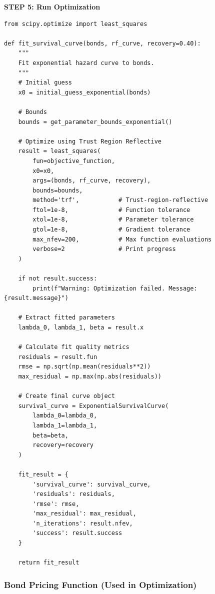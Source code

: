 \documentclass[11pt,a4paper]{article}
\begin{document}
\begin{implbox}
\textbf{STEP 5: Run Optimization}

\begin{lstlisting}
from scipy.optimize import least_squares

def fit_survival_curve(bonds, rf_curve, recovery=0.40):
    """
    Fit exponential hazard curve to bonds.
    """
    # Initial guess
    x0 = initial_guess_exponential(bonds)
    
    # Bounds
    bounds = get_parameter_bounds_exponential()
    
    # Optimize using Trust Region Reflective
    result = least_squares(
        fun=objective_function,
        x0=x0,
        args=(bonds, rf_curve, recovery),
        bounds=bounds,
        method='trf',           # Trust-region-reflective
        ftol=1e-8,              # Function tolerance
        xtol=1e-8,              # Parameter tolerance
        gtol=1e-8,              # Gradient tolerance
        max_nfev=200,           # Max function evaluations
        verbose=2               # Print progress
    )
    
    if not result.success:
        print(f"Warning: Optimization failed. Message: {result.message}")
    
    # Extract fitted parameters
    lambda_0, lambda_1, beta = result.x
    
    # Calculate fit quality metrics
    residuals = result.fun
    rmse = np.sqrt(np.mean(residuals**2))
    max_residual = np.max(np.abs(residuals))
    
    # Create final curve object
    survival_curve = ExponentialSurvivalCurve(
        lambda_0=lambda_0,
        lambda_1=lambda_1,
        beta=beta,
        recovery=recovery
    )
    
    fit_result = {
        'survival_curve': survival_curve,
        'residuals': residuals,
        'rmse': rmse,
        'max_residual': max_residual,
        'n_iterations': result.nfev,
        'success': result.success
    }
    
    return fit_result
\end{lstlisting}
\end{implbox}

\subsubsection{Bond Pricing Function (Used in Optimization)}
\end{document}
